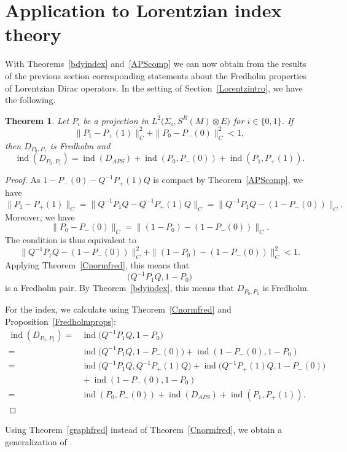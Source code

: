 \documentclass[10pt,a4paper]{amsart}
\numberwithin{equation}{section}
\newtheorem{Theorem}{Theorem}[section]
\DeclareMathOperator{\ind}{ind}
\begin{document}
	\section{Application to Lorentzian index theory}
	\label{s4}
	With Theorems~\ref{bdyindex} and~\ref{APScomp} we can now obtain from the results of the previous section corresponding statements about the Fredholm properties of Lorentzian Dirac operators. In the setting of Section~\ref{Lorentzintro}, we have the following.

	\begin{Theorem}
		\label{finalCnorm}
		Let $P_i$ be a projection in $L^2\bigl(\Sigma_i,S^R(M)\otimes E\bigr)$ for $i\in \{0,1\}$.
		If
		\[\|P_1-P_+(1)\|_C^2+\|P_0-P_-(0)\|_C^2<1,\]
		then $D_{P_0,P_1}$ is Fredholm  and
		\[\ind(D_{P_0,P_1})=\ind(D_{APS})+\ind(P_0,P_-(0))+\ind(P_1,P_+(1)).\]
	\end{Theorem}
	\begin{proof}
		As $1-P_-(0)-Q^{-1}P_+(1)Q$ is compact by Theorem~\ref{APScomp}, we have
		\[\|P_1-P_+(1)\|_C=\bigl\|Q^{-1}P_1Q-Q^{-1}P_+(1)Q\bigr\|_C=\bigl\|Q^{-1}P_1Q-(1-P_-(0))\bigr\|_C.\]
		Moreover, we have
		\[\|P_0-P_-(0)\|_C=\|(1-P_0)-(1-P_-(0))\|_C.\]
		The condition is thus equivalent to
		\[\bigl\|Q^{-1}P_1Q-(1-P_-(0))\bigr\|_C^2+\|(1-P_0)-(1-P_-(0))\|_C^2<1.\]
		Applying Theorem~\ref{Cnormfred}, this means that
		\[\bigl(Q^{-1}P_1Q,1-P_0\bigr)\]
		is a Fredholm pair. By Theorem~\ref{bdyindex}, this means that
		$D_{P_0,P_1}$ is Fredholm.

		For the index, we calculate using Theorem~\ref{Cnormfred} and Proposition~\ref{Fredholmprops}:
		\begin{align*}
			\ind(D_{P_0,P_1})={}&\ind\bigl(Q^{-1}P_1Q,1-P_0\bigr)\\
={}&\ind\bigl(Q^{-1}P_1Q,1-P_-(0)\bigr)+\ind(1-P_-(0),1-P_0)\\
={}&\ind\bigl(Q^{-1}P_1Q,Q^{-1}P_+(1)Q\bigr)+\ind\bigl(Q^{-1}P_+(1)Q,1-P_-(0)\bigr)\\
			&{} +\ind(1-P_-(0),1-P_0) \\
={}&\ind(P_0,P_-(0))+\ind(D_{APS})+\ind(P_1,P_+(1)).
\tag*{\qed}
\end{align*}
\renewcommand{\qed}{}
\end{proof}

Using Theorem~\ref{graphfred} instead of Theorem~\ref{Cnormfred}, we obtain a generalization of \cite[Proposition~4.5]{BH}.
\end{document}
